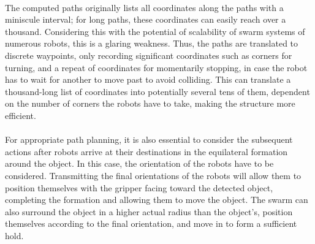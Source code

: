 \paragraph*{}
The computed paths originally lists all coordinates along the paths with a miniscule interval; for long paths, these coordinates can easily reach over a thousand. Considering this with the potential of scalability of swarm systems of numerous robots, this is a glaring weakness. Thus, the paths are translated to discrete waypoints, only recording significant coordinates such as corners for turning, and a repeat of coordinates for momentarily stopping, in case the robot has to wait for another to move past to avoid colliding. This can translate a thousand-long list of coordinates into potentially several tens of them, dependent on the number of corners the robots have to take, making the structure more efficient.

\paragraph*{}
For appropriate path planning, it is also essential to consider the subsequent actions after robots arrive at their destinations in the equilateral formation around the object. In this case, the orientation of the robots have to be considered. Transmitting the final orientations of the robots will allow them to position themselves with the gripper facing toward the detected object, completing the formation and allowing them to move the object. The swarm can also surround the object in a higher actual radius than the object's, position themselves according to the final orientation, and move in to form a sufficient hold. 

